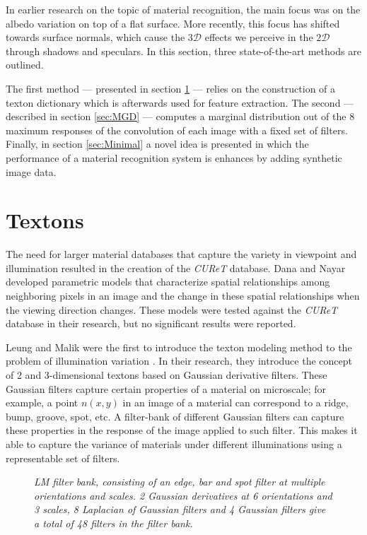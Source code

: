 \hypertarget{RelatedWork}{
}
In earlier research on the topic of material recognition, the main focus was on the albedo variation on top of a flat surface. More recently, this focus has shifted towards surface normals, which cause the $3\mathcal{D}$ effects we perceive in the $2\mathcal{D}$ through shadows and speculars. In this section, three state-of-the-art methods are outlined.

The first method --- presented in section \ref{sec:Textons} --- relies on the construction of a texton dictionary which is afterwards used for feature extraction. The second --- described in section \ref{sec:MGD} --- computes a marginal distribution out of the 8 maximum responses of the convolution of each image with a fixed set of filters. Finally, in section \ref{sec:Minimal} a novel idea is presented in which the performance of a material recognition system is enhances by adding synthetic image data.


\section{Textons}\label{sec:Textons}

The need for larger material databases that capture the variety in viewpoint and illumination resulted in the creation of the {\it CUReT} database. Dana and Nayar \cite{DanaNayar} developed parametric models that characterize spatial relationships among neighboring pixels in an image and the change in these spatial relationships when the viewing direction changes. These models were tested against the {\it CUReT} database in their research, but no significant results were reported.

Leung and Malik were the first to introduce the texton modeling method to the problem of illumination variation \cite{LeungMalik}. In their research, they introduce the concept of 2 and 3-dimensional textons based on Gaussian derivative filters. These Gaussian filters capture certain properties of a material on microscale; for example, a point $n(x,y)$ in an image of a material can correspond to a ridge, bump, groove, spot, etc. A filter-bank of different Gaussian filters can capture these properties in the response of the image applied to such filter. This makes it able to capture the variance of materials under different illuminations using a representable set of filters.

\begin{figure}[b]
	\begin{center}
	\end{center}
	\caption{\textit{LM filter bank, consisting of an edge, bar and spot filter at multiple orientations and scales. 2 Gaussian derivatives at 6 orientations and 3 scales, 8 Laplacian of Gaussian filters and 4 Gaussian filters give a total of 48 filters in the filter bank.}}
	\label{fig:LM}
\end{figure}


